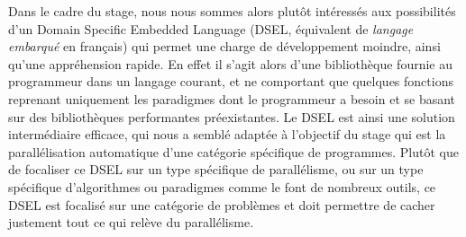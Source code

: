 Dans le cadre du stage, nous nous sommes alors plutôt intéressés aux possibilités d'un Domain Specific Embedded Language (DSEL, équivalent de \emph{langage embarqué} en français) qui permet une charge de développement moindre, ainsi qu'une appréhension rapide. En effet il s'agit alors d'une bibliothèque fournie au programmeur dans un langage courant, et ne comportant que quelques fonctions reprenant uniquement les paradigmes dont le programmeur a besoin et se basant sur des bibliothèques performantes préexistantes. Le DSEL est ainsi une solution intermédiaire efficace, qui nous a semblé adaptée à l'objectif du stage qui est la parallélisation automatique d'une catégorie spécifique de programmes. Plutôt que de focaliser ce DSEL sur un type spécifique de parallélisme, ou sur un type spécifique d'algorithmes ou paradigmes comme le font de nombreux outils, ce DSEL est focalisé sur une catégorie de problèmes et doit permettre de cacher justement tout ce qui relève du parallélisme.



